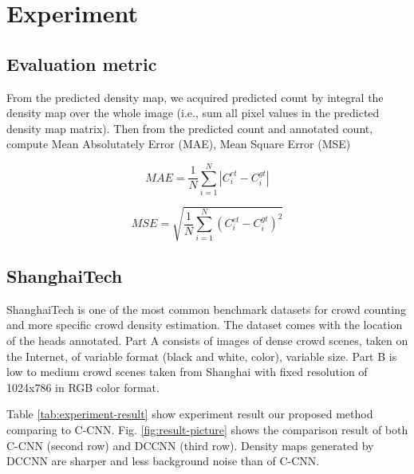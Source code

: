 \section{Experiment} \label{sec:experiment}

\subsection{Evaluation metric}


From the predicted density map, we acquired predicted count by integral the density map over the whole image (i.e., sum all pixel values in the predicted density map matrix). Then from the predicted count and annotated count, compute Mean Absolutately Error (MAE), Mean Square Error (MSE) 

\begin{equation}M A E=\frac{1}{N} \sum_{i=1}^{N}\left|C_{i}^{e t}-C_{i}^{g t}\right|\end{equation}

\begin{equation}M S E=\sqrt{\frac{1}{N} \sum_{i=1}^{N}\left(C_{i}^{e t}-C_{i}^{g t}\right)^{2}}\end{equation}

\subsection{ShanghaiTech} \label{sec:shb_result}
 


ShanghaiTech \cite{zhang2016single} is one of the most common benchmark datasets for crowd counting and more specific crowd density estimation. The dataset comes with the location of the heads annotated. Part A consists of images of dense crowd scenes, taken on the Internet, of variable format (black and white, color), variable size. Part B is low to medium crowd scenes taken from Shanghai with fixed resolution of 1024x786 in RGB color format. 

Table \ref{tab:experiment-result} show experiment result our proposed method comparing to C-CNN. Fig. \ref{fig:result-picture} shows the comparison result of both C-CNN (second row) and DCCNN (third row). Density maps generated by DCCNN are sharper and less background noise than of C-CNN.

